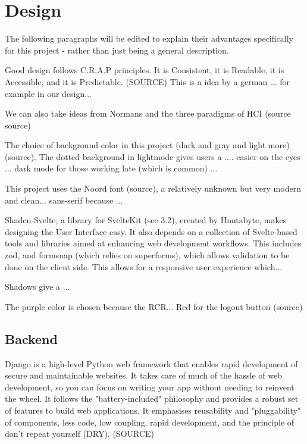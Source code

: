 \chapter{Design}
The following paragraphs will be edited to explain their advantages specifically for this project - rather than just being a general description.

Good design follows C.R.A.P principles. It is Consistent, it is Readable, it is Accessible, and it is Predictable. (SOURCE) This is a idea by a german ... for example in our design...

We can also take ideas from Normans and the three paradigms of HCI (source source)

The choice of background color in this project (dark and gray and light more) (source). The dotted background in lightmode gives users a .... easier on the eyes ... dark mode for those working late (which is common) ...

This project uses the Noord font (source), a relatively unknown but very modern and clean... sans-serif because ...

Shadcn-Svelte, a library for SvelteKit (see 3.2), created by Huntabyte, makes designing the User Interface easy. It also depends on a collection of Svelte-based tools and libraries aimed at enhancing web development workflows. This includes zod, and formsnap (which relies on superforms), which allows validation to be done on the client side. This allows for a responsive user experience which...

Shadows give a ...

The purple color is chosen because the RCR... Red for the logout button (source)
\section{Backend}
Django is a high-level Python web framework that enables rapid development of secure and maintainable websites. It takes care of much of the hassle of web development, so you can focus on writing your app without needing to reinvent the wheel. It follows the "battery-included" philosophy and provides a robust set of features to build web applications. It emphasises reusability and "pluggability" of components, less code, low coupling, rapid development, and the principle of don't repeat yourself (DRY). (SOURCE)

